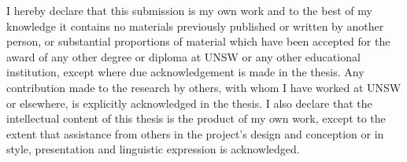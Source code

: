 %
%

\pagebreak
\vspace*{1in}
\noindent{}


\cleardoublepage
\vspace*{1in}
\noindent I hereby declare that this submission is my own work and to the best
of my knowledge it contains no materials previously published or written by
another person, or substantial proportions of material which have been accepted
for the award of any other degree or diploma at UNSW or any other educational
institution, except where due acknowledgement is made in the thesis. Any
contribution made to the research by others, with whom I have worked at UNSW or
elsewhere, is explicitly acknowledged in the thesis. I also declare that the
intellectual content of this thesis is the product of my own work, except to the
extent that assistance from others in the project's design and conception or in
style, presentation and linguistic expression is acknowledged.

\vspace{5mm}

\noindent{}

